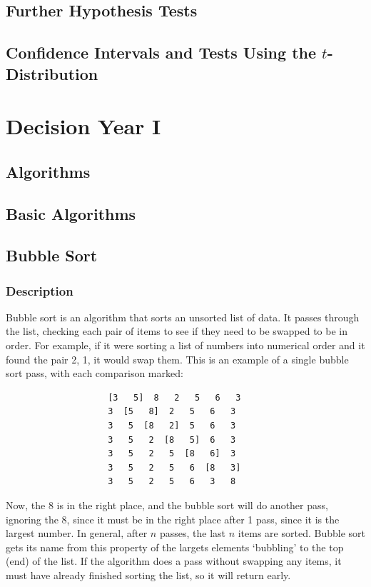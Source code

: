 \documentclass{book}
\begin{document}
    \section{Further Hypothesis Tests} \label{}
    \newpage
    \section{Confidence Intervals and Tests Using the $t$-Distribution} \label{}
    \newpage

\chapter{Decision Year I} \label{ch:decision_i}
    \section{Algorithms} \label{algorithms}
        \section{Basic Algorithms}

        \newpage

        \section{Bubble Sort}
            \subsection{Description}
                Bubble sort is an algorithm that sorts an unsorted list of data.
                It passes through the list, checking each pair of items to see if they need to be swapped to be in order.
                For example, if it were sorting a list of numbers into numerical order and it found the pair 2, 1, it would swap them.
                This is an example of a single bubble sort pass, with each comparison marked:
                \begin{verbatim}
                    [3   5]  8   2   5   6   3
                    3  [5   8]  2   5   6   3
                    3   5  [8   2]  5   6   3
                    3   5   2  [8   5]  6   3
                    3   5   2   5  [8   6]  3
                    3   5   2   5   6  [8   3]
                    3   5   2   5   6   3   8
                \end{verbatim}
                Now, the 8 is in the right place, and the bubble sort will do another pass, ignoring the 8, since it must be in the right place after 1 pass, since it is the largest number.
                In general, after $n$ passes, the last $n$ items are sorted.
                Bubble sort gets its name from this property of the largets elements `bubbling' to the top (end) of the list.
                If the algorithm does a pass without swapping any items, it must have already finished sorting the list, so it will return early.
\end{document}
